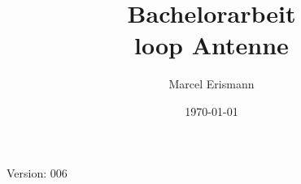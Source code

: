 \documentclass[10pt,a4paper]{article}
\author{Marcel Erismann}
\date{\today}
\title{Bachelorarbeit \\ \footnotesize{loop Antenne}}
\begin{document}
	
	Version: 006
	\tableofcontents 
	\newpage
	
\end{document}
